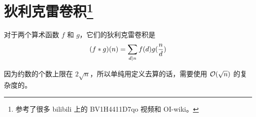 
\section[狄利克雷卷积]{狄利克雷卷积\footnote{参考了很多 bilibili 上的
        BV1H4411D7qo 视频和 OI-wiki。}}\label{sec:狄利克雷卷积}
对于两个算术函数 $f$ 和 $g$，它们的狄利克雷卷积是
$$
    (f * g)(n) = \sum_{d\mid n}f(d)g({n\over d})
$$

因为约数的个数上限在 $2\sqrt n$，所以单纯用定义去算的话，需要使用 $\mathcal{O}(\sqrt n)$
的复杂度的。


